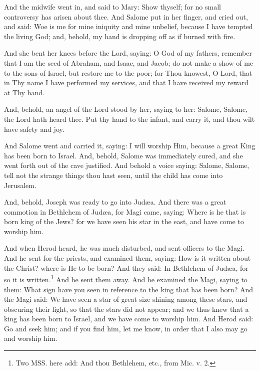 \pend\pstart
{}

\pend\setcounter{pstartR}{1}\pstart
And the midwife went in, and said to Mary: Show thyself; for no small controversy has arisen about thee. And Salome put in her finger, and cried out, and said: Woe is me for mine iniquity and mine unbelief, because I have tempted the living God; and, behold, my hand is dropping off as if burned with fire.

\pend\pstart
And she bent her knees before the Lord, saying: O God of my fathers, remember that I am the seed of Abraham, and Isaac, and Jacob; do not make a show of me to the sons of Israel, but restore me to the poor; for Thou knowest, O Lord, that in Thy name I have performed my services, and that I have received my reward at Thy hand.

\pend\pstart
And, behold, an angel of the Lord stood by her, saying to her: Salome, Salome, the Lord hath heard thee. Put thy hand to the infant, and carry it, and thou wilt have safety and joy.

\pend\pstart
And Salome went and carried it, saying: I will worship Him, because a great King has been born to Israel. And, behold, Salome was immediately cured, and she went forth out of the cave justified. And behold a voice saying: Salome, Salome, tell not the strange things thou hast seen, until the child has come into Jerusalem.

\pend\pstart
{}

\pend\setcounter{pstartR}{1}\pstart
And, behold, Joseph was ready to go into Judæa. And there was a great commotion in Bethlehem of Judæa, for Magi came, saying: Where is he that is born king of the Jews? for we have seen his star in the east, and have come to worship him.

\pend\pstart
And when Herod heard, he was much disturbed, and sent officers to the Magi. And he sent for the priests, and examined them, saying: How is it written about the Christ? where is He to be born? And they said: In Bethlehem of Judæa, for so it is written.\footnote{Two MSS. here add: And thou Bethlehem, etc., from Mic. v. 2.} And he sent them away. And he examined the Magi, saying to them: What sign have you seen in reference to the king that has been born? And the Magi said: We have seen a star of great size shining among these stars, and obscuring their light, so that the stars did not appear; and we thus knew that a king has been born to Israel, and we have come to worship him. And Herod said: Go and seek him; and if you find him, let me know, in order that I also may go and worship him.


